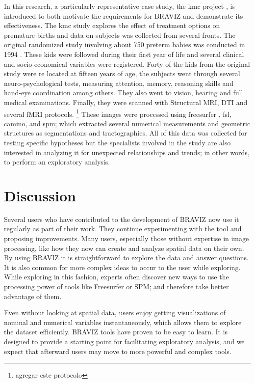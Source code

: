 \documentclass[utf8,paper]{frontiersSCNS} %
\begin{document}
In this research, a particularly representative case study, the kmc project \cite{schneider_cerebral_2012}, is introduced to both motivate the requirements for BRAVIZ and demonstrate its effectiveness. The kmc study explores the effect of treatment options on premature births and data on subjects was collected from several fronts. The original randomized study involving about 750 preterm babies was conducted in 1994 \citep{charpak_kangaroo_1997}. These kids were followed during their first year \citep{charpak_randomized_2001, tessier_kangaroo_2009} of life and several clinical and socio-economical variables were registered. Forty of the kids from the original study were re located at fifteen years of age, the  subjects went through several neuro-psychological tests, measuring attention, memory, reasoning skills and hand-eye coordination among others. They also went to vision, hearing and full medical examinations. Finally, they were scanned with Structural MRI, DTI and several fMRI protocols. \footnote{agregar este protocolo} These images were processed using freesurfer \citep{fischl_freesurfer_2012}, fsl\citep{jenkinson_fsl_2012}, camino\citep{cook_camino:_2006}, and spm\citep{friston_statistical_2006}; which extracted several numerical measurements and geometric structures as segmentations and tractographies. All of this data was collected for testing specific hypotheses but the specialists involved in the study are also interested in analyzing it for unexpected relationships and trends; in other words, to perform an exploratory analysis\citep{tukey_we_1980}.

\section{Discussion}

Several users who have contributed to the development of BRAVIZ now use it regularly as part of their work. They continue experimenting with the tool and proposing improvements. Many users, especially those without expertise in image processing, like how they now can create and analyze spatial data on their own.  By using BRAVIZ it is straightforward to explore the data and answer questions. It is also common for more complex ideas to occur to the user while exploring. While exploring in this fashion, experts often discover new ways to use the processing power of tools like Freesurfer or SPM; and therefore take better advantage of them.

Even without looking at spatial data, users enjoy getting visualizations of nominal and numerical variables instantaneously, which allows them to explore the dataset efficiently. BRAVIZ tools have proven to be easy to learn. It is designed to provide a starting point for facilitating exploratory analysis, and we expect that afterward users may move to more powerful and complex tools.
\end{document}
